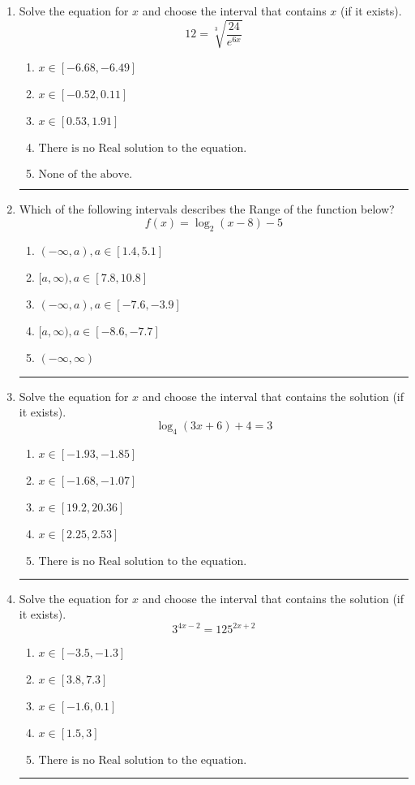 \documentclass[14pt]{extbook}
\newcommand{\litem}[1]{\item#1\hspace*{-1cm}\rule{\textwidth}{0.4pt}}
\begin{document}
\begin{enumerate}
{\begin{enumerate}[label=\Alph*.]
\end{enumerate} }
\litem{
 Solve the equation for $x$ and choose the interval that contains $x$ (if it exists).\[  12 = \sqrt[3]{\frac{24}{e^{6x}}} \]\begin{enumerate}[label=\Alph*.]
\item \( x \in [-6.68, -6.49] \)
\item \( x \in [-0.52, 0.11] \)
\item \( x \in [0.53, 1.91] \)
\item \( \text{There is no Real solution to the equation.} \)
\item \( \text{None of the above.} \)

\end{enumerate} }
\litem{
Which of the following intervals describes the Range of the function below?\[ f(x) = \log_2{(x-8)}-5 \]\begin{enumerate}[label=\Alph*.]
\item \( (-\infty, a), a \in [1.4, 5.1] \)
\item \( [a, \infty), a \in [7.8, 10.8] \)
\item \( (-\infty, a), a \in [-7.6, -3.9] \)
\item \( [a, \infty), a \in [-8.6, -7.7] \)
\item \( (-\infty, \infty) \)

\end{enumerate} }
\litem{
Solve the equation for $x$ and choose the interval that contains the solution (if it exists).\[ \log_{4}{(3x+6)}+4 = 3 \]\begin{enumerate}[label=\Alph*.]
\item \( x \in [-1.93, -1.85] \)
\item \( x \in [-1.68, -1.07] \)
\item \( x \in [19.2, 20.36] \)
\item \( x \in [2.25, 2.53] \)
\item \( \text{There is no Real solution to the equation.} \)

\end{enumerate} }
\litem{
Solve the equation for $x$ and choose the interval that contains the solution (if it exists).\[ 3^{4x-2} = 125^{2x+2} \]\begin{enumerate}[label=\Alph*.]
\item \( x \in [-3.5, -1.3] \)
\item \( x \in [3.8, 7.3] \)
\item \( x \in [-1.6, 0.1] \)
\item \( x \in [1.5, 3] \)
\item \( \text{There is no Real solution to the equation.} \)


\end{enumerate}}
\end{enumerate}
\end{document}
